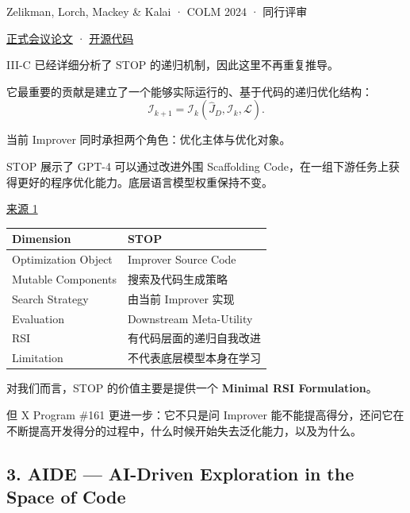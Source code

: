 Zelikman, Lorch, Mackey \& Kalai · COLM 2024 · 同行评审

\href{https://proceedings.colm.cc/paper_files/paper/2024/hash/52eb24c316c78cc144dfa54f1f4bb4ec-Abstract-Conference.html}{正式会议论文} · \href{https://github.com/microsoft/STOP}{开源代码}

III-C 已经详细分析了 STOP 的递归机制，因此这里不再重复推导。

它最重要的贡献是建立了一个能够实际运行的、基于代码的递归优化结构：
\[\mathcal I_{k+1}
=
\mathcal I_k
(\widehat J_D,\mathcal I_k,\mathcal L).\]

当前 Improver 同时承担两个角色：优化主体与优化对象。

STOP 展示了 GPT-4 可以通过改进外围 Scaffolding Code，在一组下游任务上获得更好的程序优化能力。底层语言模型权重保持不变。

\href{https://proceedings.colm.cc/paper_files/paper/2024/hash/52eb24c316c78cc144dfa54f1f4bb4ec-Abstract-Conference.html}{来源 1}

\begin{readertable}
\begin{longtable}[]{@{}
  >{\raggedright\arraybackslash}p{}
  >{\raggedright\arraybackslash}p{}@{}}
\toprule
Dimension & STOP \\
\midrule
\endhead
Optimization Object & Improver Source Code \\
Mutable Components & 搜索及代码生成策略 \\
Search Strategy & 由当前 Improver 实现 \\
Evaluation & Downstream Meta-Utility \\
RSI & 有代码层面的递归自我改进 \\
Limitation & 不代表底层模型本身在学习 \\
\bottomrule
\end{longtable}
\end{readertable}

对我们而言，STOP 的价值主要是提供一个 \textbf{Minimal RSI Formulation}。

但 X Program \#161 更进一步：它不只是问 Improver 能不能提高得分，还问它在不断提高开发得分的过程中，什么时候开始失去泛化能力，以及为什么。

\hypertarget{part-3-44-0001-aide-ai-driven-exploration-in-the-space-of-code}{%
\subsection{3. AIDE --- AI-Driven Exploration in the Space of Code}\label{part-3-44-0001-aide-ai-driven-exploration-in-the-space-of-code}}

